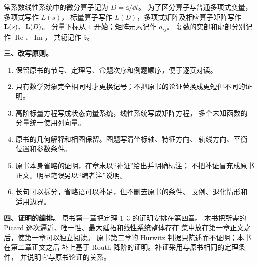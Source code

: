 常系数线性系统中的微分算子记为 $D=\dd/\dd t$。
为了区分算子与普通多项式变量，多项式写作 $L(s)$，
标量算子写作 $L(D)$，多项式矩阵及相应算子矩阵写作 $\mathbf{L}(s)$、$\mathbf{L}(D)$。
分量下标从 $1$ 开始；矩阵元素记作 $a_{ij}$。
复数的实部和虚部分别记作 $\operatorname{Re}$、$\operatorname{Im}$，
共轭记作 $\overline z$。

\noindent\textbf{三、改写原则。}
\begin{enumerate}[label=(\arabic*)]
  \item 保留原书的节号、定理号、命题次序和例题顺序，便于逐页对读。
  \item 只有数学对象完全相同时才更换记号；不把原书的论证替换成更短但不同的证明。
  \item 高阶标量方程写成状态向量系统，线性系统写成矩阵方程，
        多个未知函数的分量统一使用列向量。
  \item 原书的几何解释和相图保留。图题写清坐标轴、特征方向、
        轨线方向、平衡位置和参数条件。
  \item 原书本身省略的证明，在章末以“补证”给出并明确标注；
        不把补证冒充成原书正文。明显笔误另以“编者注”说明。
  \item 长句可以拆分，省略语可以补足，但不删去原书的条件、
        反例、退化情形和适用边界。
\end{enumerate}

\noindent\textbf{四、证明的编排。}
原书第一章把定理 1--3 的证明安排在第四章。
本书把所需的 Picard 逐次逼近、唯一性、最大延拓和线性系统整体存在
集中放在第一章正文之后，使第一章可以独立阅读。
原书第二章的 Hurwitz 判据只陈述而不证明；本书在第二章正文之后
补上基于 Routh 降阶的证明。补证采用与原书相同的定理条件，
并说明它与原书论证的关系。
